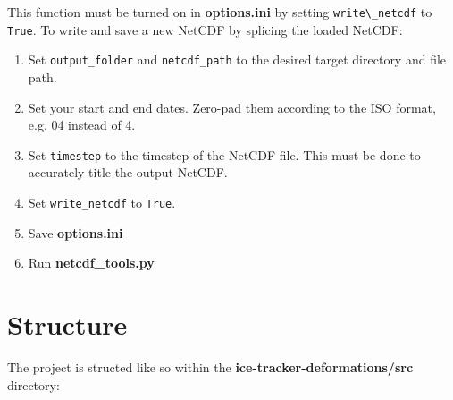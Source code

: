 \documentclass{article}
\begin{document}
\begin{itemize}
            This function must be turned on in \textbf{options.ini} by setting \verb?write\_netcdf? to \verb?True?. To write and save a new NetCDF by splicing the loaded NetCDF:
            \begin{enumerate}
                \item Set \verb?output_folder? and \verb?netcdf_path? to the desired target directory and file path.
                \item Set your start and end dates. Zero-pad them according to the ISO format, e.g. 04 instead of 4.
                \item Set \verb?timestep? to the timestep of the NetCDF file. This must be done to accurately title the output NetCDF.
                \item Set \verb?write_netcdf? to \verb?True?.
                \item Save \textbf{options.ini}
                \item Run \textbf{netcdf\_tools.py}
            \end{enumerate}
        \end{itemize}

\section{Structure}
\label{Structure}

    The project is structed like so within the \textbf{ice-tracker-deformations/src} directory:
    \begin{figure}[H]
        \centering
        \begin{minipage}[b]{.5\textwidth}
        \end{minipage}%
        \begin{minipage}{.5\textwidth}
        \end{minipage}
    \end{figure}
\end{document}
